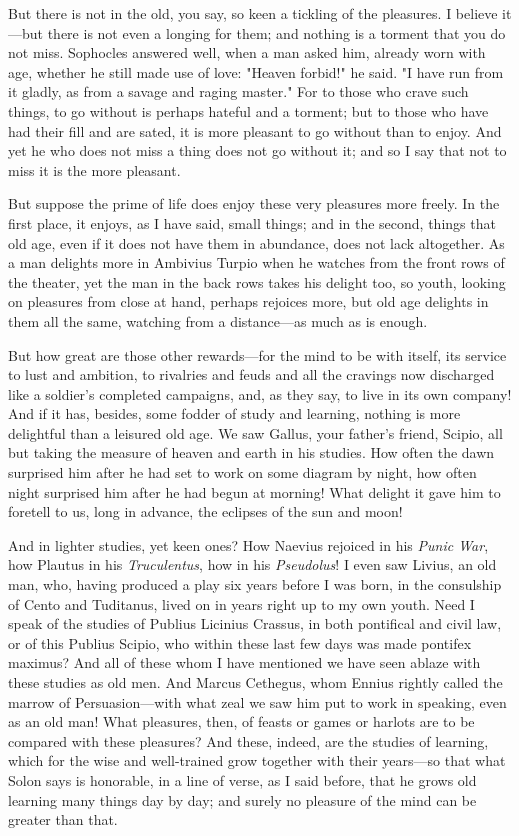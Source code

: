  But there is not in the old, you say, so keen a tickling of the pleasures. I believe it—but there is not even a longing for them; and nothing is a torment that you do not miss. Sophocles answered well, when a man asked him, already worn with age, whether he still made use of love: "Heaven forbid!" he said. "I have run from it gladly, as from a savage and raging master." For to those who crave such things, to go without is perhaps hateful and a torment; but to those who have had their fill and are sated, it is more pleasant to go without than to enjoy. And yet he who does not miss a thing does not go without it; and so I say that not to miss it is the more pleasant.

 But suppose the prime of life does enjoy these very pleasures more freely. In the first place, it enjoys, as I have said, small things; and in the second, things that old age, even if it does not have them in abundance, does not lack altogether. As a man delights more in Ambivius Turpio when he watches from the front rows of the theater, yet the man in the back rows takes his delight too, so youth, looking on pleasures from close at hand, perhaps rejoices more, but old age delights in them all the same, watching from a distance—as much as is enough.

 But how great are those other rewards—for the mind to be with itself, its service to lust and ambition, to rivalries and feuds and all the cravings now discharged like a soldier's completed campaigns, and, as they say, to live in its own company! And if it has, besides, some fodder of study and learning, nothing is more delightful than a leisured old age. We saw Gallus, your father's friend, Scipio, all but taking the measure of heaven and earth in his studies. How often the dawn surprised him after he had set to work on some diagram by night, how often night surprised him after he had begun at morning! What delight it gave him to foretell to us, long in advance, the eclipses of the sun and moon!

 And in lighter studies, yet keen ones? How Naevius rejoiced in his \textit{Punic War}, how Plautus in his \textit{Truculentus}, how in his \textit{Pseudolus}! I even saw Livius, an old man, who, having produced a play six years before I was born, in the consulship of Cento and Tuditanus, lived on in years right up to my own youth. Need I speak of the studies of Publius Licinius Crassus, in both pontifical and civil law, or of this Publius Scipio, who within these last few days was made pontifex maximus? And all of these whom I have mentioned we have seen ablaze with these studies as old men. And Marcus Cethegus, whom Ennius rightly called the marrow of Persuasion—with what zeal we saw him put to work in speaking, even as an old man! What pleasures, then, of feasts or games or harlots are to be compared with these pleasures? And these, indeed, are the studies of learning, which for the wise and well-trained grow together with their years—so that what Solon says is honorable, in a line of verse, as I said before, that he grows old learning many things day by day; and surely no pleasure of the mind can be greater than that.

